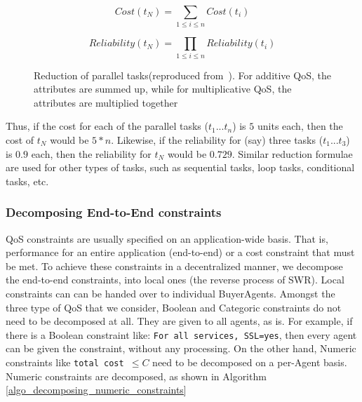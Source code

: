 \documentclass[10pt,journal,compsoc]{IEEEtran}
\begin{document}
\begin{equation}
Cost(t_{N}) = \sum_{1 \leq i \leq n} Cost(t_{i})
\end{equation}

\begin{equation}
Reliability(t_{N}) = \prod_{1 \leq i \leq n} Reliability(t_{i})
\end{equation}

\begin{figure}[h]
	\centering
	\caption{Reduction of parallel tasks(reproduced from~\cite{Cardoso2004Quality}). For additive QoS, the attributes are summed up, while for multiplicative QoS, the attributes are multiplied together\label{fig:parallel_reduction}}
\end{figure}

Thus, if the cost for each of the parallel tasks ($t_{1}...t_{n}$) is $5$ units each, then the cost of $t_{N}$ would be $5 * n$. Likewise, if the reliability for (say) three tasks ($t_{1}...t_{3}$) is $0.9$ each, then the reliability for $t_{N}$ would be $0.729$. Similar reduction formulae~\cite{Cardoso2004Quality} are used for other types of tasks, such as sequential tasks, loop tasks, conditional tasks, etc.


\subsubsection{Decomposing End-to-End constraints\label{decomposing_constraints}} QoS constraints are usually specified on an application-wide basis. That is, performance for an entire application (end-to-end) or a cost constraint that must be met. To achieve these constraints in a decentralized manner, we decompose the end-to-end constraints, into local ones (the reverse process of SWR). Local constraints can can be handed over to individual BuyerAgents. Amongst the three type of QoS that we consider, Boolean and Categoric constraints do not need to be decomposed at all. They are given to all agents, as is. For example, if there is a Boolean constraint like: \texttt{For all services, SSL=yes}, then every agent can be given the constraint, without any processing. On the other hand, Numeric constraints like \texttt{total cost $\leq C$} need to be decomposed on a per-Agent basis. Numeric constraints are decomposed, as shown in Algorithm \ref{algo_decomposing_numeric_constraints}
\end{document}
